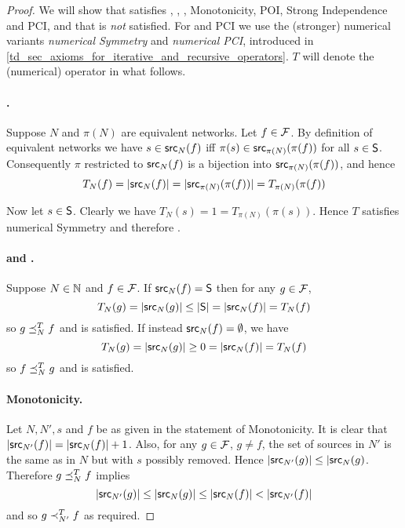\begin{proof}

    We will show that \voting{} satisfies \symmetry{}, \unanimity{}, \groundedness{},
    Monotonicity, POI, Strong Independence and PCI, and that \coherence{} is
    \emph{not} satisfied. For \symmetry{} and PCI we use the (stronger) numerical
variants \emph{numerical Symmetry} and \emph{numerical PCI}, introduced in
\cref{td_sec_axioms_for_iterative_and_recursive_operators}. $T$ will denote
the (numerical) \voting{} operator in what follows.

    \paragraph{\symmetry{}.} Suppose $N$ and $\pi(N)$ are equivalent networks. Let $f
\in \F$. By definition of equivalent networks we have $s \in \src_N(f)$ iff
$\pi(s) \in \src_{\pi(N)}(\pi(f))$ for all $s \in \S$. Consequently $\pi$
restricted to $\src_N(f)$ is a bijection into $\src_{\pi(N)}(\pi(f))$, and
hence
\[
    T_N(f) = |\src_N(f)| = |\src_{\pi(N)}(\pi(f))| = T_{\pi(N)}(\pi(f))
\]

Now let $s \in \S$. Clearly we have $T_N(s) = 1 = T_{\pi(N)}(\pi(s))$. Hence
    $T$ satisfies numerical Symmetry and therefore \symmetry{}.

    \paragraph{\unanimity{} and \groundedness{}.} Suppose $N \in \N$ and $f \in \F$. If
$\src_N(f) = \S$ then for any $g \in \F$,
\[
    T_N(g) = |\src_N(g)| \le |\S| = |\src_N(f)| = T_N(f)
\]
    so $g \fle_N^{T} f$ and \unanimity{} is satisfied. If instead $\src_N(f)
= \emptyset$, we have
\[
    T_N(g) = |\src_N(g)| \ge 0 = |\src_N(f)| = T_N(f)
\]
    so $f \fle_N^{T} g$ and \groundedness{} is satisfied.

\paragraph{Monotonicity.} Let $N, N', s$ and $f$ be as given in the statement
of Monotonicity. It is clear that $|\src_{N'}(f)| = |\src_N(f)| + 1$. Also, for
any $g \in \F$, $g \ne f$, the set of sources in $N'$ is the same as in $N$ but
with $s$ possibly removed. Hence $|\src_{N'}(g)| \le |\src_N(g)$. Therefore $g
\fle_N^{T} f$ implies
\[
    |\src_{N'}(g)| \le |\src_N(g)| \le |\src_N(f)| < |\src_{N'}(f)|
\]
and so $g \flt_{N'}^{T} f$ as required.


\end{proof}
